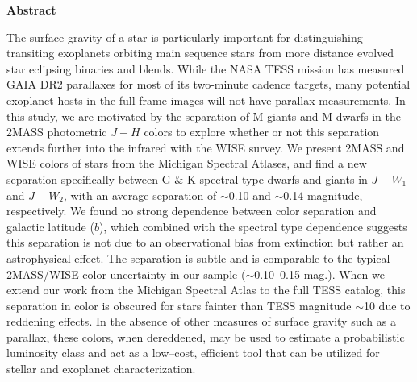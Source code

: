 {}
\vspace*{\fill}
\begin{center}
\textbf{Abstract}

The surface gravity of a star is particularly important for distinguishing transiting exoplanets orbiting main sequence stars from more distance evolved star eclipsing binaries and blends. While the NASA TESS mission has measured GAIA DR2 parallaxes for most of its two-minute cadence targets, many potential exoplanet hosts in the full-frame images will not have parallax measurements. In this study, we are motivated by the separation of M giants and M dwarfs in the 2MASS photometric $J-H$ colors to explore whether or not this separation extends further into the infrared with the WISE survey. We present 2MASS and WISE colors of \bincount stars from the Michigan Spectral Atlases, and find a new separation specifically between G \& K spectral type dwarfs and giants in $J-W_{1}$ and $J-W_{2}$, with an average separation of $\sim$0.10 and $\sim$0.14 magnitude, respectively. We found no strong dependence between color separation and galactic latitude ($b$), which combined with the spectral type dependence suggests this separation is not due to an observational bias from extinction but rather an astrophysical effect. The separation is subtle and is comparable to the typical 2MASS/WISE color uncertainty in our sample ($\sim$0.10--0.15 mag.). When we extend our work from the Michigan Spectral Atlas to the full TESS catalog, this separation in color is obscured for stars fainter than TESS magnitude $\sim$10 due to reddening effects. In the absence of other measures of surface gravity such as a parallax, these colors, when dereddened, may be used to estimate a probabilistic luminosity class and act as a low--cost, efficient tool that can be utilized for stellar and exoplanet characterization.

\end{center}
\vspace{\fill}

